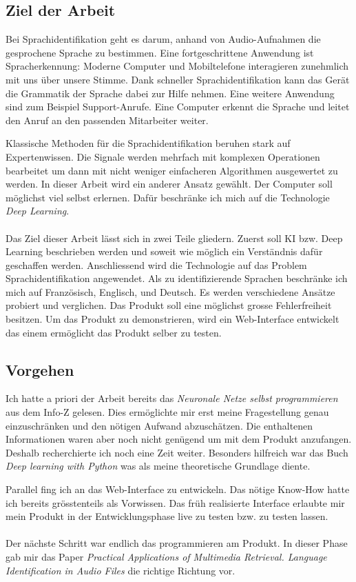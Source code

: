 \subsection{Ziel der Arbeit}
Bei Sprachidentifikation geht es darum, anhand von Audio-Aufnahmen die gesprochene Sprache zu bestimmen. Eine fortgeschrittene Anwendung ist Spracherkennung: Moderne
Computer und Mobiltelefone interagieren zunehmlich mit uns über unsere Stimme. Dank schneller Sprachidentifikation kann das Gerät die Grammatik der Sprache dabei zur Hilfe
nehmen.
Eine weitere Anwendung sind zum Beispiel Support-Anrufe. Eine Computer erkennt die Sprache und leitet den Anruf an den passenden Mitarbeiter weiter.

Klassische Methoden für die Sprachidentifikation beruhen stark auf Expertenwissen. Die Signale werden mehrfach mit komplexen Operationen bearbeitet um dann mit nicht weniger
einfacheren Algorithmen ausgewertet zu werden.
In dieser Arbeit wird ein anderer Ansatz gewählt. Der Computer soll möglichst viel selbst erlernen. Dafür beschränke ich mich auf die Technologie \textit{Deep Learning}.
\\ \\ 
Das Ziel dieser Arbeit lässt sich in zwei Teile gliedern. Zuerst soll KI bzw. Deep Learning beschrieben werden und soweit wie möglich ein Verständnis dafür geschaffen werden.
Anschliessend wird die Technologie auf das Problem Sprachidentifikation angewendet. Als zu identifizierende Sprachen beschränke ich mich auf Französisch, Englisch, und Deutsch. Es
werden verschiedene Ansätze probiert und verglichen. Das Produkt soll eine möglichst grosse Fehlerfreiheit besitzen. Um das Produkt zu demonstrieren, wird ein Web-Interface
entwickelt das einem ermöglicht das Produkt selber zu testen.

\subsection{Vorgehen}
Ich hatte a priori der Arbeit bereits das \textit{Neuronale Netze selbst programmieren}\parencite{neuronale_netze} aus dem Info-Z gelesen. Dies ermöglichte mir erst meine
Fragestellung genau einzuschränken und den nötigen Aufwand abzuschätzen.
Die enthaltenen Informationen waren aber noch nicht genügend um mit dem Produkt anzufangen. Deshalb recherchierte ich noch eine Zeit weiter. Besonders hilfreich war das Buch
\textit{Deep learning with Python}\parencite{chollet} was als meine theoretische Grundlage diente.

Parallel fing ich an das Web-Interface zu entwickeln. Das nötige Know-How hatte ich bereits grösstenteils als Vorwissen. Das früh realisierte Interface erlaubte mir mein Produkt in der
Entwicklungsphase live zu testen bzw. zu testen lassen.
\\ \\ 
Der nächste Schritt war endlich das programmieren am Produkt. In dieser Phase gab mir das Paper \textit{Practical Applications of Multimedia Retrieval. Language Identification in Audio
Files}\parencite{iLID} die richtige Richtung vor. 

